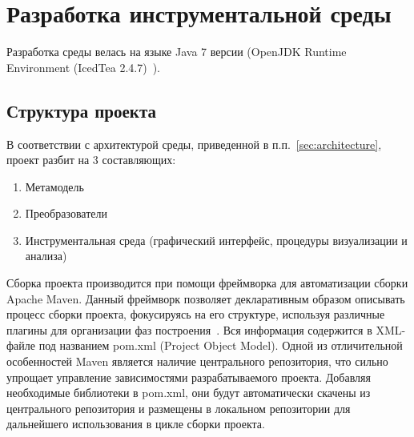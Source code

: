\chapter{Разработка инструментальной среды}


Разработка среды велась на языке Java 7 версии (OpenJDK Runtime Environment
(IcedTea 2.4.7)~\cite{Gosling2013}).

\section{Структура проекта}

В соответствии с архитектурой среды, приведенной в п.п.~\ref{sec:architecture},
проект разбит на 3 составляющих:

\begin{enumerate}
    \item Метамодель
    \item Преобразователи
    \item Инструментальная среда (графический интерфейс, процедуры визуализации
    и анализа)
\end{enumerate}



Сборка проекта производится при помощи фреймворка для автоматизации сборки
Apache Maven. Данный фреймворк позволяет декларативным образом описывать процесс
сборки проекта, фокусируясь на его структуре, используя различные плагины для
организации фаз построения~\cite{Maven2001-2005}. Вся информация содержится в
XML-файле под названием pom.xml (Project Object Model). Одной из отличительной
особенностей Maven является наличие центрального репозитория, что сильно
упрощает управление зависимостями разрабатываемого проекта. Добавляя необходимые
библиотеки в pom.xml, они будут автоматически скачены из центрального
репозитория и размещены в локальном репозитории для дальнейшего использования в
цикле сборки проекта.

